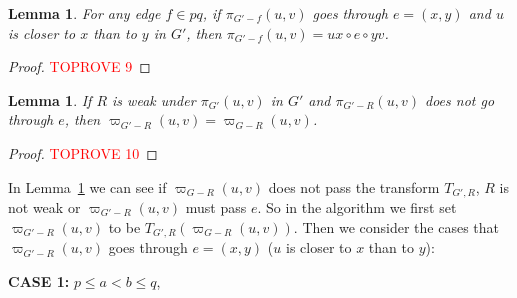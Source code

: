 \documentclass[11pt]{article}
\theoremstyle{plain}
\newtheorem{lemma}[theorem]{Lemma}
\theoremstyle{definition}
\newcommand{\nng}[3]{\pi_{G'-#3}\left(#1,#2\right)}
\newcommand{\odg}[3]{\varpi_{G-#3}\left(#1,#2\right)}
\newcommand{\ndg}[3]{\varpi_{G'-#3}\left(#1,#2\right)}
\newcommand{\pp}[1]{T_{G',R}\left(#1\right)}
\begin{document}
\begin{lemma}\label{lemma4-6}
    For any edge $f\in pq$, if $\nng{u}{v}{f}$ goes through $e=(x,y)$ and $u$ is closer to $x$ than to $y$ in $G'$, then $\nng{u}{v}{f}=ux\circ e \circ yv$.
\end{lemma}

\begin{proof}\textcolor{red}{TOPROVE 9}\end{proof}

\begin{lemma}\label{thm:not-pass-e}
    If $R$ is weak under $\pi_{G'}(u,v)$ in $G'$ and $\nng{u}{v}{R}$ does not go through $e$, then $\ndg{u}{v}{R}=\odg{u}{v}{R}$.
\end{lemma}
\begin{proof}\textcolor{red}{TOPROVE 10}\end{proof}

In Lemma~\ref{thm:not-pass-e} we can see if $\odg{u}{v}{R}$ does not pass the transform $T_{G',R}$, $R$ is not weak or $\ndg{u}{v}{R}$ must pass $e$. So in the algorithm we first set $\ndg{u}{v}{R}$ to be $\pp{\odg{u}{v}{R}}$. Then we consider the cases that $\ndg{u}{v}{R}$ goes through $e=(x,y)$ ($u$ is closer to $x$ than to $y$):

\vspace{5pt}




\noindent\textbf{CASE 1:} $p\le a<b\le q$,
\end{document}

